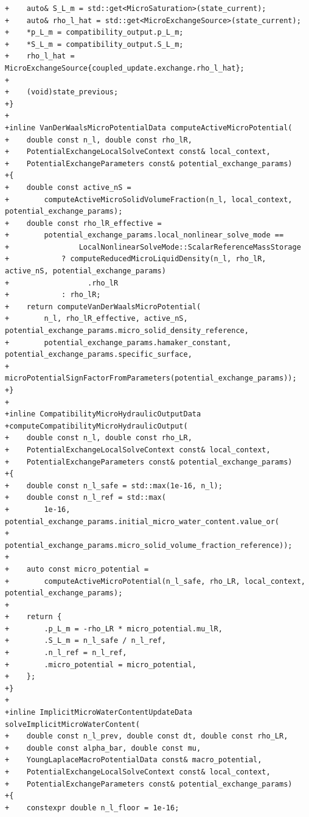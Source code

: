 \documentclass[10pt]{article}
\begin{document}
\begin{lstlisting}
+    auto& S_L_m = std::get<MicroSaturation>(state_current);
+    auto& rho_l_hat = std::get<MicroExchangeSource>(state_current);
+    *p_L_m = compatibility_output.p_L_m;
+    *S_L_m = compatibility_output.S_L_m;
+    rho_l_hat = MicroExchangeSource{coupled_update.exchange.rho_l_hat};
+
+    (void)state_previous;
+}
+
+inline VanDerWaalsMicroPotentialData computeActiveMicroPotential(
+    double const n_l, double const rho_lR,
+    PotentialExchangeLocalSolveContext const& local_context,
+    PotentialExchangeParameters const& potential_exchange_params)
+{
+    double const active_nS =
+        computeActiveMicroSolidVolumeFraction(n_l, local_context, potential_exchange_params);
+    double const rho_lR_effective =
+        potential_exchange_params.local_nonlinear_solve_mode ==
+                LocalNonlinearSolveMode::ScalarReferenceMassStorage
+            ? computeReducedMicroLiquidDensity(n_l, rho_lR, active_nS, potential_exchange_params)
+                  .rho_lR
+            : rho_lR;
+    return computeVanDerWaalsMicroPotential(
+        n_l, rho_lR_effective, active_nS, potential_exchange_params.micro_solid_density_reference,
+        potential_exchange_params.hamaker_constant, potential_exchange_params.specific_surface,
+        microPotentialSignFactorFromParameters(potential_exchange_params));
+}
+
+inline CompatibilityMicroHydraulicOutputData
+computeCompatibilityMicroHydraulicOutput(
+    double const n_l, double const rho_LR,
+    PotentialExchangeLocalSolveContext const& local_context,
+    PotentialExchangeParameters const& potential_exchange_params)
+{
+    double const n_l_safe = std::max(1e-16, n_l);
+    double const n_l_ref = std::max(
+        1e-16, potential_exchange_params.initial_micro_water_content.value_or(
+                   potential_exchange_params.micro_solid_volume_fraction_reference));
+
+    auto const micro_potential =
+        computeActiveMicroPotential(n_l_safe, rho_LR, local_context, potential_exchange_params);
+
+    return {
+        .p_L_m = -rho_LR * micro_potential.mu_lR,
+        .S_L_m = n_l_safe / n_l_ref,
+        .n_l_ref = n_l_ref,
+        .micro_potential = micro_potential,
+    };
+}
+
+inline ImplicitMicroWaterContentUpdateData solveImplicitMicroWaterContent(
+    double const n_l_prev, double const dt, double const rho_LR,
+    double const alpha_bar, double const mu,
+    YoungLaplaceMacroPotentialData const& macro_potential,
+    PotentialExchangeLocalSolveContext const& local_context,
+    PotentialExchangeParameters const& potential_exchange_params)
+{
+    constexpr double n_l_floor = 1e-16;

\end{lstlisting}
\end{document}
